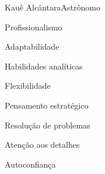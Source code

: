 \documentclass{article}
\begin{document}
\begin{cv}[fotocv]{Kauê Alcântara}{Astrônomo}
\vspace{15pt}

\begin{cvevent}[2021][2020]
\end{cvevent}

\vspace{15pt}

\begin{cvevent}[2020][2018]
\end{cvevent}

\cvsidebar %



\begin{cvitem}
    Profissionalismo
\end{cvitem}

\cvseparator
\begin{cvitem}
    Adaptabilidade
\end{cvitem}

\cvseparator
\begin{cvitem}
    Habilidades analíticas
\end{cvitem}

\cvseparator
\begin{cvitem}
    Flexibilidade
\end{cvitem}

\cvseparator
\begin{cvitem}
    Pensamento estratégico
\end{cvitem}

\cvseparator
\begin{cvitem}
    Resolução de problemas
\end{cvitem}

\cvseparator
\begin{cvitem}
    Atenção aos detalhes
\end{cvitem}

\cvseparator
\begin{cvitem}
    Autoconfiança
\end{cvitem}




\end{cv}
\end{document}

